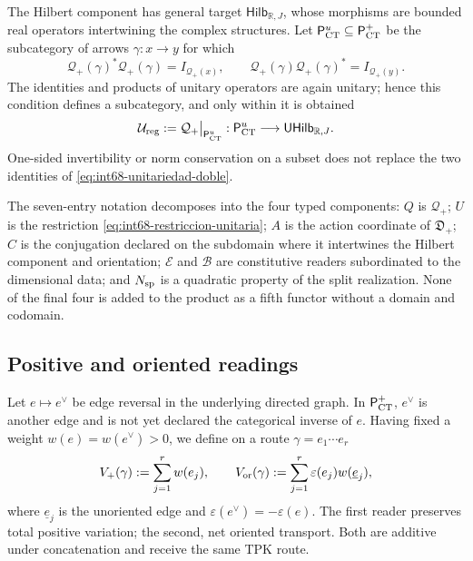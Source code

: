 The Hilbert component has general target
\(\mathsf{Hilb}_{\mathbb R,J}\), whose morphisms are bounded real
operators intertwining the complex structures. Let
\(\mathsf P_{\rm CT}^{u}\subseteq\mathsf P_{\rm CT}^{+}\) be the subcategory
of arrows \(\gamma:x\to y\) for which
\begin{equation}
 \mathcal Q_+(\gamma)^*\mathcal Q_+(\gamma)=I_{\mathcal Q_+(x)},
 \qquad
 \mathcal Q_+(\gamma)\mathcal Q_+(\gamma)^*=I_{\mathcal Q_+(y)}.
 \label{eq:int68-unitariedad-doble}
\end{equation}
The identities and products of unitary operators are again
unitary; hence this condition defines a subcategory, and only within it is
obtained
\begin{equation}
 \mathcal U_{\rm reg}:=
 \mathcal Q_+\big|_{\mathsf P_{\rm CT}^{u}}:
 \mathsf P_{\rm CT}^{u}\longrightarrow
 \mathsf{UHilb}_{\mathbb R,J}.
 \label{eq:int68-restriccion-unitaria}
\end{equation}
One-sided invertibility or norm conservation on a subset does not
replace the two identities of \eqref{eq:int68-unitariedad-doble}.

The seven-entry notation decomposes into the four typed components: \(Q\) is \(\mathcal Q_+\); \(U\) is the restriction \eqref{eq:int68-restriccion-unitaria}; \(A\) is the action coordinate of \(\mathfrak D_+\); \(C\) is the conjugation declared on the subdomain where it intertwines the Hilbert component and orientation; \(\mathcal E\) and \(\mathcal B\) are constitutive readers subordinated to the dimensional data; and \(N_{\rm sp}\) is a quadratic property of the split realization. None of the final four is added to the product as a fifth functor without a domain and codomain.

\subsection{Positive and oriented readings}

Let \(e\mapsto e^\vee\) be edge reversal in the underlying directed
graph. In \(\mathsf P_{\rm CT}^{+}\), \(e^\vee\) is another edge and is not
yet declared the categorical inverse of \(e\). Having fixed a weight
\(w(e)=w(e^\vee)>0\), we define on a route
\(\gamma=e_1\cdots e_r\)
\[
 V_+(\gamma):=\sum_{j=1}^r w(e_j),
 \qquad
 V_{\rm or}(\gamma):=
 \sum_{j=1}^r\varepsilon(e_j)w(\underline e_j),
\]
where \(\underline e_j\) is the unoriented edge and
\(\varepsilon(e^\vee)=-\varepsilon(e)\). The first reader preserves
total positive variation; the second, net oriented transport. Both are
additive under concatenation and receive the same TPK route.

